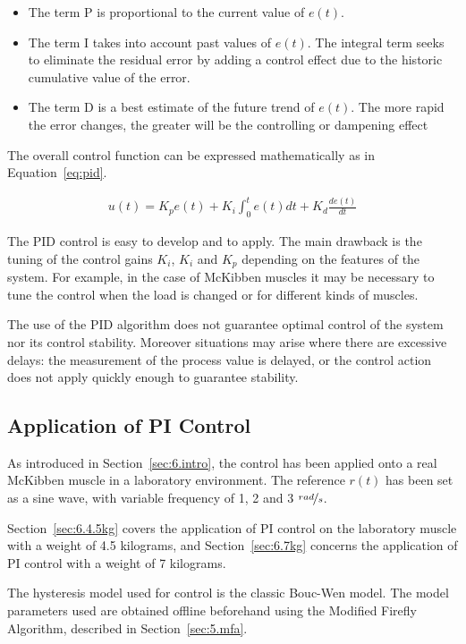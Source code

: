 \begin{itemize}
	\item The term P is proportional to the current value of $e(t)$.
	\item The term I takes into account past values of $e(t)$. 
		The integral term seeks to eliminate the residual error by adding
		a control effect due to the historic cumulative value of the error.
	\item The term D is a best estimate of the future trend of $e(t)$.
	The more rapid the error changes, the greater will be
	the controlling or dampening effect
\end{itemize}

The overall control function can be expressed mathematically as in Equation~\ref{eq:pid}.

\begin{align}
\label{eq:pid}
u(t) = K_p e(t) + K_i \int_0^t{e(t)dt} + K_d \frac{de(t)}{dt}
\end{align}

The PID control is easy to develop and to apply. 
The main drawback is the tuning of the control gains $K_i$, $K_i$ and $K_p$
depending on the features of the system. For example, in the case of McKibben
muscles it may be necessary to tune the control when the load is changed
or for different kinds of muscles.

The use of the PID algorithm does not guarantee optimal control of the system
nor its control stability. Moreover situations may arise where there are excessive delays:
the measurement of the process value is delayed,
or the control action does not apply quickly enough to guarantee stability.

\subsection{Application of PI Control}

As introduced in Section~\ref{sec:6.intro}, the control has been applied onto
a real McKibben muscle in a laboratory environment. 
The reference $r(t)$ has been set as a sine wave, with variable frequency of 1, 2 and 3
$\nicefrac{rad}{s}$.

Section~\ref{sec:6.4.5kg} covers the application of PI control on the laboratory
muscle with a weight of 4.5 kilograms, and Section~\ref{sec:6.7kg} concerns
the application of PI control with a weight of 7 kilograms.

The hysteresis model used for control is the classic Bouc-Wen model.
The model parameters used are obtained offline beforehand using the Modified Firefly
Algorithm, described in Section~\ref{sec:5.mfa}.

